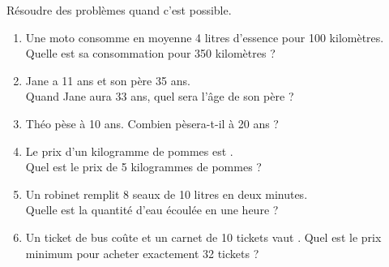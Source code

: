 \begin{exercice*}
   Résoudre des problèmes quand c'est possible.
   \begin{enumerate}
      \item Une moto consomme en moyenne 4 litres d'essence pour 100 kilomètres. \\
         Quelle est sa consommation pour 350 kilomètres ?
      \item Jane a 11 ans et son père 35 ans. \\
         Quand Jane aura 33 ans, quel sera l'âge de son père ?
      \item Théo pèse  à 10 ans.
         Combien pèsera-t-il à 20 ans ?
      \item Le prix d'un kilogramme de pommes est . \\
         Quel est le prix de 5 kilogrammes de pommes ?
      \item Un robinet remplit 8 seaux de 10 litres en deux minutes. \\
         Quelle est la quantité d'eau écoulée en une heure ?
      \item Un ticket de bus coûte  et un carnet de 10 tickets vaut .
         Quel est le prix minimum pour acheter exactement 32 tickets ?
   \end{enumerate}
\end{exercice*}